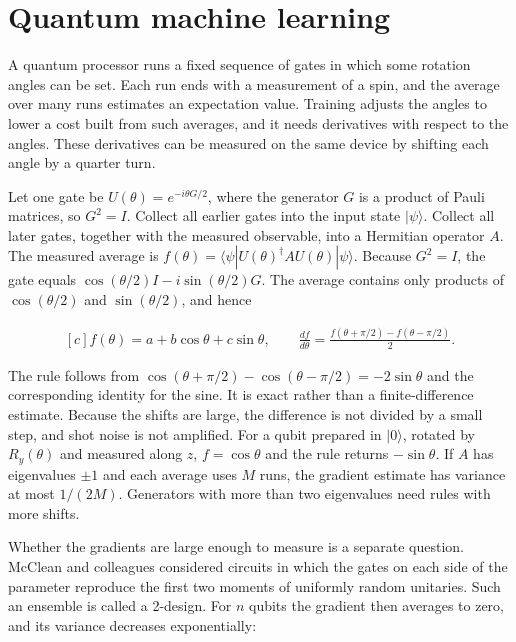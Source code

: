 \documentclass[11pt,oneside]{book}
\newenvironment{centeredalign}{\[\begin{gathered}[c]}{\end{gathered}\]}
\begin{document}
\clearpage

\section{Quantum machine learning}

\label{topic:quantum-machine-learning}

A quantum processor runs a fixed sequence of gates in which some rotation angles can be set. Each run ends with a measurement of a spin, and the average over many runs estimates an expectation value. Training adjusts the angles to lower a cost built from such averages, and it needs derivatives with respect to the angles. These derivatives can be measured on the same device by shifting each angle by a quarter turn.

Let one gate be \(U(\theta)=e^{-i\theta G/2}\), where the generator \(G\) is a product of Pauli matrices, so \(G^2=I\). Collect all earlier gates into the input state \(|\psi\rangle\). Collect all later gates, together with the measured observable, into a Hermitian operator \(A\). The measured average is \(f(\theta)=\langle\psi|U(\theta)^\dagger AU(\theta)|\psi\rangle\). Because \(G^2=I\), the gate equals \(\cos(\theta/2)I-i\sin(\theta/2)G\). The average contains only products of \(\cos(\theta/2)\) and \(\sin(\theta/2)\), and hence

\begin{centeredalign}
f(\theta)=a+b\cos\theta+c\sin\theta,\qquad
\frac{df}{d\theta}=\frac{f(\theta+\pi/2)-f(\theta-\pi/2)}{2}.
\end{centeredalign}

The rule follows from \(\cos(\theta+\pi/2)-\cos(\theta-\pi/2)=-2\sin\theta\) and the corresponding identity for the sine. It is exact rather than a finite-difference estimate. Because the shifts are large, the difference is not divided by a small step, and shot noise is not amplified. For a qubit prepared in \(|0\rangle\), rotated by \(R_y(\theta)\) and measured along \(z\), \(f=\cos\theta\) and the rule returns \(-\sin\theta\). If \(A\) has eigenvalues \(\pm1\) and each average uses \(M\) runs, the gradient estimate has variance at most \(1/(2M)\). Generators with more than two eigenvalues need rules with more shifts.

Whether the gradients are large enough to measure is a separate question. McClean and colleagues considered circuits in which the gates on each side of the parameter reproduce the first two moments of uniformly random unitaries. Such an ensemble is called a 2-design. For \(n\) qubits the gradient then averages to zero, and its variance decreases exponentially:
\end{document}
